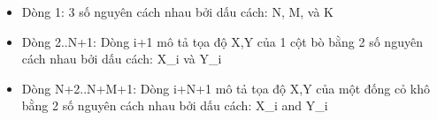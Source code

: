 \begin{itemize}
	\item     Dòng 1: 3 số nguyên cách nhau bởi dấu cách: N, M, và K   
	\item     Dòng 2..N+1: Dòng i+1 mô tả tọa độ X,Y của 1 cột bò         bằng 2 số nguyên cách nhau bởi dấu cách: X\_i và Y\_i   
	\item     Dòng N+2..N+M+1: Dòng i+N+1 mô tả tọa độ X,Y của một         đống cỏ khô bằng 2 số nguyên cách nhau bởi dấu cách: X\_i and Y\_i   
\end{itemize}